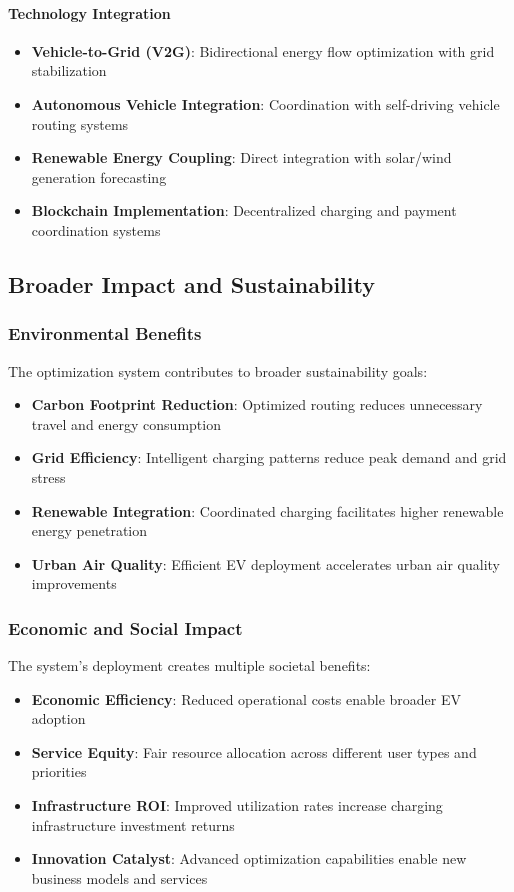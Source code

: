 \documentclass[12pt,a4paper]{article}
\begin{document}
\paragraph{Technology Integration}
\begin{itemize}
    \item \textbf{Vehicle-to-Grid (V2G)}: Bidirectional energy flow optimization with grid stabilization
    \item \textbf{Autonomous Vehicle Integration}: Coordination with self-driving vehicle routing systems
    \item \textbf{Renewable Energy Coupling}: Direct integration with solar/wind generation forecasting
    \item \textbf{Blockchain Implementation}: Decentralized charging and payment coordination systems
\end{itemize}

\subsection{Broader Impact and Sustainability}

\subsubsection{Environmental Benefits}
The optimization system contributes to broader sustainability goals:

\begin{itemize}
    \item \textbf{Carbon Footprint Reduction}: Optimized routing reduces unnecessary travel and energy consumption
    \item \textbf{Grid Efficiency}: Intelligent charging patterns reduce peak demand and grid stress
    \item \textbf{Renewable Integration}: Coordinated charging facilitates higher renewable energy penetration
    \item \textbf{Urban Air Quality}: Efficient EV deployment accelerates urban air quality improvements
\end{itemize}

\subsubsection{Economic and Social Impact}
The system's deployment creates multiple societal benefits:

\begin{itemize}
    \item \textbf{Economic Efficiency}: Reduced operational costs enable broader EV adoption
    \item \textbf{Service Equity}: Fair resource allocation across different user types and priorities
    \item \textbf{Infrastructure ROI}: Improved utilization rates increase charging infrastructure investment returns
    \item \textbf{Innovation Catalyst}: Advanced optimization capabilities enable new business models and services
\end{itemize}
\end{document}
